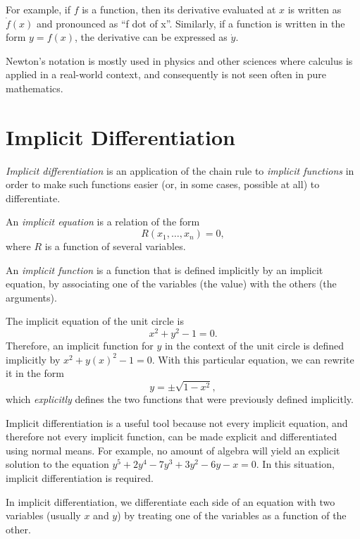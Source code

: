 \documentclass[headings=standardclasses]{scrreprt}
\begin{document}
For example, if \(f\) is a function, then its derivative evaluated at \(x\) is
written as \(\dot f(x)\) and pronounced as \enquote{f dot of x}. Similarly, if a
function is written in the form \(y = f(x)\), the derivative can be expressed as
\(\dot y\).

Newton's notation is mostly used in physics and other sciences where calculus is
applied in a real-world context, and consequently is not seen often in pure
mathematics.

\section{Implicit Differentiation}

\emph{Implicit differentiation} is an application of the chain rule to
\emph{implicit functions} in order to make such functions easier (or, in some
cases, possible at all) to differentiate.

\begin{definition}
  An \emph{implicit equation} is a relation of the form
  \[ R(x_{1}, \dots, x_{n}) = 0, \] where \(R\) is a function of several
  variables.

  An \emph{implicit function} is a function that is defined implicitly by an
  implicit equation, by associating one of the variables (the value) with the
  others (the arguments).
\end{definition}

\begin{example}
  The implicit equation of the unit circle is \[ x^{2} + y^{2} - 1 = 0. \]
  Therefore, an implicit function for \(y\) in the context of the unit circle is
  defined implicitly by \(x^{2} + {y(x)}^{2} - 1 = 0\). With this particular
  equation, we can rewrite it in the form \[ y = ±\sqrt{1 - x^{2}}, \] which
  \emph{explicitly} defines the two functions that were previously defined
  implicitly.
\end{example}

Implicit differentiation is a useful tool because not every implicit equation,
and therefore not every implicit function, can be made explicit and
differentiated using normal means. For example, no amount of algebra will yield
an explicit solution to the equation \(y^{5} + 2y^{4} - 7y^{3} + 3y^{2} - 6y - x
= 0\). In this situation, implicit differentiation is required.

In implicit differentiation, we differentiate each side of an equation with two
variables (usually \(x\) and \(y\)) by treating one of the variables as a
function of the other.
\end{document}
